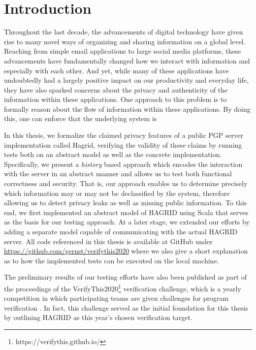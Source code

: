 
\section{Introduction}
Throughout the last decade, the advancements of digital technology have given rise to many novel ways of organizing and sharing information on a global level.
Reaching from simple email applications to large social media platforms, these advancements have fundamentally changed how we interact with information and especially with each other.
And yet, while many of these applications have undoubtedly had a largely positive impact on our productivity and everyday life, they have also sparked concerns about the privacy and authenticity of the information within these applications. 
One approach to this problem is to formally reason about the flow of information within these applications. By doing this, one can enforce that the underlying system is  

In this thesis, we formalize the claimed privacy features of a public PGP server implementation called Hagrid, verifying the validity of these claims by running tests both on an abstract model as well as the concrete implementation. Specifically, we present a \emph{history} based approach which encodes the interaction with the server in an abstract manner and allows us to test both functional correctness and security. That is, our approach enables us to determine precisely which information may or may not be declassified by the system, therefore allowing us to detect privacy leaks as well as missing public information. To this end, we first implemented an abstract model of HAGRID using Scala that serves as the basis for our testing approach. At a later stage, we extended our efforts by adding a separate model capable of communicating with the actual HAGRID server. All code referenced in this thesis is available at GitHub under \url{https://github.com/gernst/verifythis2020} where we also give a short explanation as to how the implemented tests can be executed on the local machine.

The preliminary results of our testing efforts have also been published as part of the proceedings of the VerifyThis2020\footnote{https://verifythis.github.io/} verification challenge, which is a yearly competition in which participating teams are given challenges for program verification \cite{VTLTC2020/IFTesting}. In fact, this challenge served as the initial foundation for this thesis by outlining HAGRID as this year's chosen verification target.

